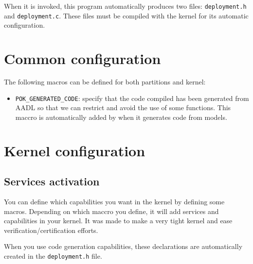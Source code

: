 When it is invoked, this program automatically produces two files:
\texttt{deployment.h} and \texttt{deployment.c}. These files must be compiled
with the kernel for its automatic configuration.


\section{Common configuration}
The following macros can be defined for both partitions and kernel:
\begin{itemize}
   \item
      \texttt{POK\_GENERATED\_CODE}: specify that the code compiled has been
      generated from AADL so that we can restrict and avoid the use of some
      functions. This maccro is automatically added by \ocarina when it generates
      code from \aadl models.
\end{itemize}

\section{Kernel configuration}
   \subsection{Services activation}
   You can define which capabilities you want in the kernel by defining
   some macros. Depending on which maccro you define, it will add services and
   capabilities in your kernel. It was made to make a very tight kernel and
   ease verification/certification efforts.

   When you use code generation capabilities, these declarations are
   automatically created in the \texttt{deployment.h} file.

